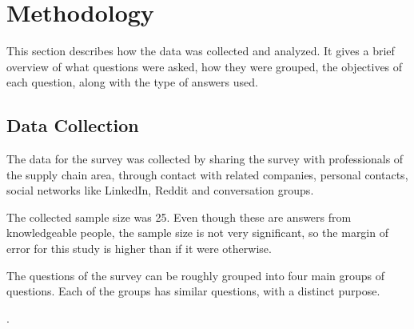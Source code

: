 \section{Methodology}
This section describes how the data was collected and analyzed. It gives a brief overview of what questions were asked, how they were grouped, the objectives of each question, along with the type of answers used.


\subsection{Data Collection}
The data for the survey was collected by sharing the survey with professionals of the supply chain area, through contact with related companies, personal contacts, social networks like LinkedIn, Reddit and conversation groups. 

The collected sample size was 25. Even though these are answers from knowledgeable people, the sample size is not very significant, so the margin of error for this study is higher than if it were otherwise. 


The questions of the survey can be roughly grouped into four main groups of questions. Each of the groups has similar questions, with a distinct purpose.
  
.

